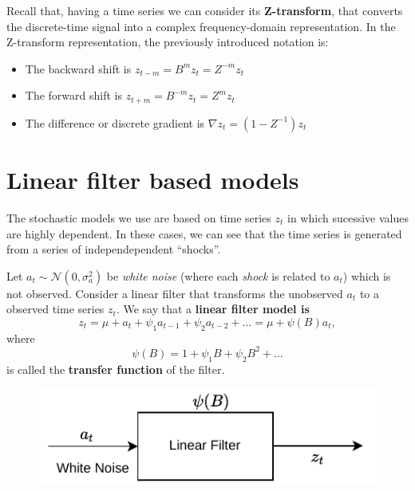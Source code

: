 Recall that, having a time series we can consider its \textbf{Z-transform}, that converts the discrete-time signal into a complex frequency-domain representation. In the Z-transform representation, the previously introduced notation is:
\begin{itemize}
  \item The backward shift is \(z_{t-m} = B^{m}z_{t} = Z^{-m}z_{t}\)
  \item The forward shift is \(z_{t+m} = B^{-m}z_{t} = Z^{m}z_{t}\)
        \item The difference or discrete gradient is \(\nabla z_{t} = (1-Z^{-1})z_{t}\)
\end{itemize}


\section{Linear filter based models}

The stochastic models we use are based on time series \(z_{t}\) in which sucessive values are highly dependent. In these cases, we can see that the time series is generated from a series of independependent ``shocks''.

\begin{ndef}
  Let \(a_{t} \sim \mathcal N\left(0,\sigma_{a}^{2}\right)\) be \emph{white noise} (where each \emph{shock} is related to \(a_{t}\)) which is not observed. Consider a linear filter that transforms the unobserved \(a_{t}\) to a observed time series \(z_{t}\). We say that a \textbf{linear filter model is}
  \begin{equation}\label{linear:filter}
    z_{t} = \mu + a_{t} + \psi_{1}a_{t-1} + \psi_{2}a_{t-2} + \dots = \mu + \psi(B)a_{t},
  \end{equation}
  where
  \[
    \psi(B) = 1 + \psi_{1}B + \psi_{2}B^{2} + \dots
  \]
  is called the \textbf{transfer function} of the filter.
\end{ndef}

\begin{figure}[H]

  \centering
  \includegraphics{Figures/LinearFilter}

\end{figure}

